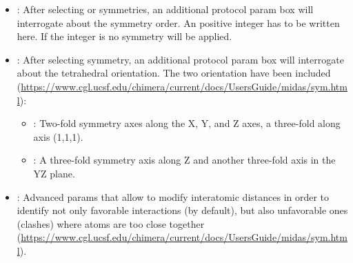 \begin{itemize}
\begin{itemize}
            \begin{itemize}
            \item {}: \chimera orientation ; two-fold symmetry axes along the X, Y, and Z axes.
            \item {}: \chimera orientation ; idem except rotated 90\degree about Z. 
            \item {}: \chimera orientation ; two-fold symmetry along Y and 5-fold along Z. 
            \item {}: \chimera orientation ; idem except rotated 180\degree about X.
            \item {}: \chimera orientation ; two-fold symmetry along X and 3-fold along Z. 
            \item {}: \chimera orientation ; idem except rotated 180\degree about Y.
            \item {}: \chimera orientation ; two-fold symmetry along X and 5-fold along Z.
            \item {}: \chimera orientation ; idem  except rotated 180\degree about Y.
            \end{itemize}
    \item {}: After selecting  or  symmetries, an additional protocol param box will interrogate about the symmetry order. An positive integer has to be written here. If the integer is  no symmetry will be applied. 
    \item {}: After selecting  symmetry, an additional protocol param box will interrogate about the tetrahedral orientation. The two \chimera orientation have been included (\url{https://www.cgl.ucsf.edu/chimera/current/docs/UsersGuide/midas/sym.html}):
            \begin{itemize}
            \item {}: Two-fold symmetry axes along the X, Y, and Z axes, a three-fold along axis (1,1,1).
            \item {}: A three-fold symmetry axis along Z and another three-fold axis in the YZ plane.
            \end{itemize}
    \item {}: Advanced params that allow to modify interatomic distances in order to identify not only favorable interactions (by default), but also unfavorable ones (clashes) where atoms are too close together (\url{https://www.cgl.ucsf.edu/chimera/current/docs/UsersGuide/midas/sym.html}).

\end{itemize}
\end{itemize}
